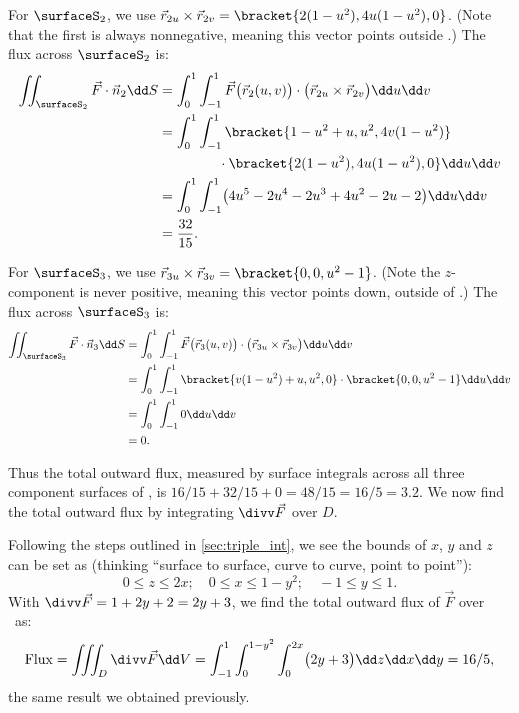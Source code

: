 \begin{example}
For $\surfaceS_2$, we use $\vec r_{2u}\times\vec r_{2v} =\bracket{2(1-u^2), 4u(1-u^2),0}$. (Note that the first is always nonnegative, meaning this vector points outside \surfaceS.) The flux across $\surfaceS_2$ is:
\begin{align*}
	\iint_{\surfaceS_2} \vec F\cdot \vec n_2\dd S
	&= \int_0^1\int_{-1}^1 \vec F\bigl(\vec r_2(u,v)\bigr)\cdot \bigl(\vec r_{2u}\times\vec r_{2v}\bigr)\dd u\dd v\\
	&= \int_0^1\int_{-1}^1\bracket{1-u^2+u, u^2, 4v(1-u^2)}\\
	&\hphantom{=\int_0^1\int_{-1}^1}\cdot\bracket{2(1-u^2), 4u(1-u^2),0}\dd u\dd v\\
	&= \int_0^1\int_{-1}^1 \bigl(4u^5-2u^4-2u^3+4u^2-2u-2\bigr)\dd u\dd v\\
	&= \frac{32}{15}.
\end{align*}

For $\surfaceS_3$, we use $\vec r_{3u}\times\vec r_{3v} =\bracket{0,0,u^2-1}$. (Note the $z$-component is never positive, meaning this vector points down, outside of \surfaceS.) The flux across $\surfaceS_3$ is:
\begin{align*}
	\iint_{\surfaceS_3} \vec F\cdot \vec n_3\dd S
	&= \int_0^1\int_{-1}^1 \vec F\bigl(\vec r_3(u,v)\bigr)\cdot \bigl(\vec r_{3u}\times\vec r_{3v}\bigr)\dd u\dd v\\
	&= \int_0^1\int_{-1}^1\bracket{v(1-u^2)+u,u^2,0}\cdot\bracket{0,0,u^2-1}\dd u\dd v\\
	&= \int_0^1\int_{-1}^1 0\dd u\dd v\\
	&= 0.
\end{align*}

Thus the total outward flux, measured by surface integrals across all three component surfaces of \surfaceS, is $16/15+32/15+0 = 48/15 = 16/5 = 3.2$. We now find the total outward flux by integrating $\divv \vec F$ over $D$.

Following the steps outlined in \autoref{sec:triple_int}, we see the bounds of $x$, $y$ and $z$ can be set as (thinking ``surface to surface, curve to curve, point to point''):
\[0\leq z\leq 2x;\quad 0\leq x\leq 1-y^2;\quad -1\leq y\leq 1.\]
With $\divv \vec F = 1+2y+2 = 2y+3$, we find the total outward flux of $\vec F$ over \surfaceS\ as:
\[
\text{Flux} = \iiint_D\divv \vec F\dd V
= \int_{-1}^1\int_0^{1-y^2}\int_0^{2x}\bigl(2y+3\bigr)\dd z\dd x\dd y = 16/5,
\]
the same result we obtained previously.
\end{example}

